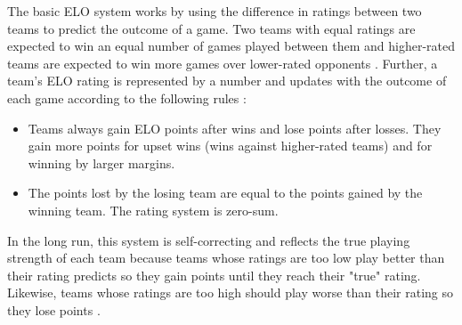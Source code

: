 \documentclass[pageno]{jpaper}
\begin{document}
The basic ELO system works by using the difference in ratings between two teams to predict the outcome of a game. Two teams with equal ratings are expected to win an equal number of games played between them and higher-rated teams are expected to win more games over lower-rated opponents \cite{wikielo}. Further, a team's ELO rating is represented by a number and updates with the outcome of each game according to the following rules \cite{538elo}:
\begin{itemize}
    \item Teams always gain ELO points after wins and lose points after losses. They gain more points for upset wins (wins against higher-rated teams) and for winning by larger margins.
    \item The points lost by the losing team are equal to the points gained by the winning team. The rating system is zero-sum.
\end{itemize}
In the long run, this system is self-correcting and reflects the true playing strength of each team because teams whose ratings are too low play better than their rating predicts so they gain points until they reach their "true" rating. Likewise, teams whose ratings are too high should play worse than their rating so they lose points \cite{wikielo}.
\end{document}
